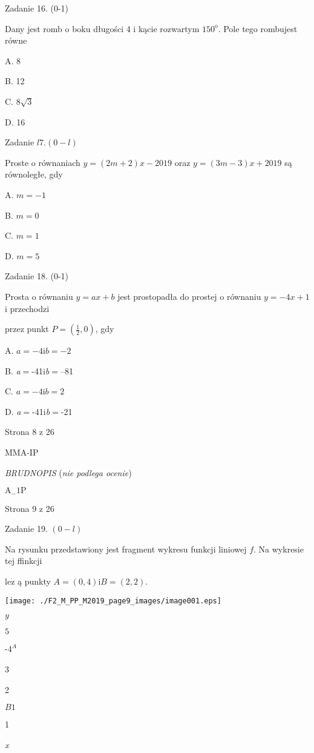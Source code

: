 \documentclass[a4paper,12pt]{article}
\begin{document}
Zadanie 16. (0-1)

Dany jest romb o boku długości 4 i kącie rozwartym $150^{\mathrm{o}}$. Pole tego rombujest równe

A. 8

B. 12

C. $8\sqrt{3}$

D. 16

Zadanie $l7. (0-l)$

Proste o równaniach $y=(2m+2)x-2019$ oraz $y=(3m-3)x+2019$ są równoległe, gdy

A. $m=-1$

B. $m=0$

C. $m=1$

D. $m=5$

Zadanie 18. (0-1)

Prosta o równaniu $y=ax+b$ jest prostopadła do prostej o równaniu $y=-4x+1$ i przechodzi

przez punkt $P=(\displaystyle \frac{1}{2},0)$, gdy

A. $a=-4\mathrm{i}b=-2$

B. {\it a}$=$-41i{\it b}$=$--81

C. $a=-4\mathrm{i}b=2$

D. {\it a}$=$-41i{\it b}$=$-21

Strona 8 z 26

MMA-IP





{\it BRUDNOPIS} ({\it nie podlega ocenie})

$\mathrm{A}_{-}1\mathrm{P}$

Strona 9 z 26





Zadanie 19. $(0-l)$

Na rysunku przedstawiony jest fragment wykresu funkcji liniowej $f$. Na wykresie tej ffinkcji

$\mathrm{l}\mathrm{e}\dot{\mathrm{z}}$ ą punkty $A=(0,4)\mathrm{i}B=(2,2).$
\begin{center}
\texttt{[image: ./F2\_M\_PP\_M2019\_page9\_images/image001.eps]}
\end{center}
$y$

$5$

-$4^{A}$

3

2

$B1$

1

{\it x}
\end{document}
